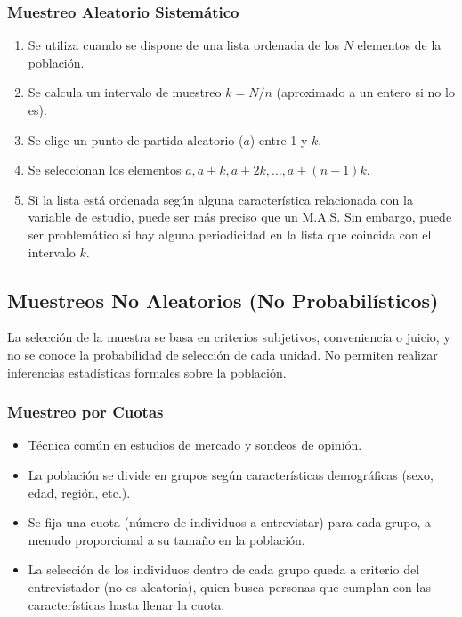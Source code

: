 \documentclass[12pt, letterpaper]{article}
\begin{document}
\subsubsection{Muestreo Aleatorio Sistemático}
\begin{enumerate}
    \item Se utiliza cuando se dispone de una lista ordenada de los $N$ elementos de la población.
    \item Se calcula un intervalo de muestreo $k = N/n$ (aproximado a un entero si no lo es).
    \item Se elige un punto de partida aleatorio ($a$) entre 1 y $k$.
    \item Se seleccionan los elementos $a, a+k, a+2k, \dots, a+(n-1)k$.
    \item Si la lista está ordenada según alguna característica relacionada con la variable de estudio, puede ser más preciso que un M.A.S. Sin embargo, puede ser problemático si hay alguna periodicidad en la lista que coincida con el intervalo $k$.
\end{enumerate}

\subsection{Muestreos No Aleatorios (No Probabilísticos)}
La selección de la muestra se basa en criterios subjetivos, conveniencia o juicio, y no se conoce la probabilidad de selección de cada unidad. No permiten realizar inferencias estadísticas formales sobre la población.
\subsubsection{Muestreo por Cuotas}
\begin{itemize}
    \item Técnica común en estudios de mercado y sondeos de opinión.
    \item La población se divide en grupos según características demográficas (sexo, edad, región, etc.).
    \item Se fija una cuota (número de individuos a entrevistar) para cada grupo, a menudo proporcional a su tamaño en la población.
    \item La selección de los individuos dentro de cada grupo queda a criterio del entrevistador (no es aleatoria), quien busca personas que cumplan con las características hasta llenar la cuota.
\end{itemize}
\end{document}
